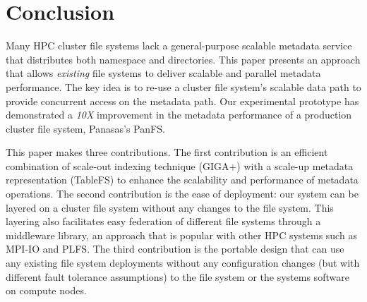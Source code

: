 \section{Conclusion}
\label{conclusion}

Many HPC cluster file systems lack a general-purpose scalable metadata service
that distributes both namespace and directories. This paper presents an approach
that allows {\it existing} file systems to deliver scalable and parallel 
metadata performance. The key idea is to re-use a cluster file system's
scalable data path to provide concurrent access on the metadata path. 
Our experimental prototype has demonstrated a {\it 10X} improvement in the
metadata performance of a production cluster file system, Panasas's PanFS. 

This paper makes three contributions.
The first contribution is an efficient combination of scale-out indexing 
technique (GIGA+) with a scale-up metadata representation (TableFS) to enhance 
the scalability and performance of metadata operations.
The second contribution is the ease of deployment: our system can be layered 
on a cluster file system without any changes to the file system. This layering 
also facilitates easy federation of different file systems through a middleware 
library, an approach that is popular with other HPC systems such as MPI-IO and
PLFS.
The third contribution is the portable design that can use any existing file
system deployments without any configuration changes (but with different fault
tolerance assumptions) to the file system or the systems software on compute
nodes. 

